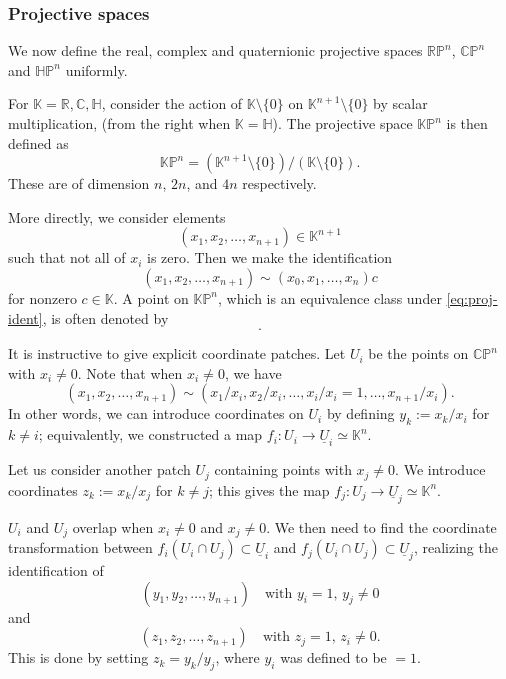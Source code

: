 \documentclass[12pt]{article}
\numberwithin{equation}{section}
\theoremstyle{remark}
\def\bC{\mathbb{C}}
\def\bH{\mathbb{H}}
\def\bK{\mathbb{K}}
\def\bR{\mathbb{R}}
\def\RP{\mathbb{RP}}
\def\CP{\mathbb{CP}}
\def\HP{\mathbb{HP}}
\def\KP{\mathbb{KP}}
\begin{document}
\subsubsection{Projective spaces}
We now define the real, complex and quaternionic projective spaces $\RP^n$, $\CP^n$ and $\HP^n$ uniformly.
\begin{example}
  \label{ex:proj}
  For $\bK=\bR,\bC,\bH$, 
  consider the action of $\bK\setminus \{0\}$ on
  $\bK^{n+1}\setminus\{0\}$ by scalar multiplication, (from the right when $\bK=\bH$).
  The projective space $\KP^n$ is then defined as
  \begin{equation}
    \KP^n = (\bK^{n+1}\setminus\{0\})/(\bK\setminus\{0\}).
  \end{equation}
  These are of dimension $n$, $2n$, and $4n$ respectively.
\end{example}
More directly, we consider elements 
\begin{equation}
(x_1,x_2,\ldots,x_{n+1})\in \bK^{n+1}
\end{equation} such that not all of $x_i$ is zero.
Then we make the identification \begin{equation}
  (x_1,x_2,\ldots,x_{n+1}) \sim  ( x_0, x_1, \ldots,  x_n)c \label{eq:proj-ident}
\end{equation} for nonzero $c\in \bK$.
A point on $\KP^n$,
which is an equivalence class under \eqref{eq:proj-ident},
is often denoted by \begin{equation}
  [x_1:x_2:\cdots:x_{n+1}].
\end{equation}


It is instructive to give explicit coordinate patches.
Let $U_i$ be the points on $\CP^n$ with $x_i\neq 0$.
Note that when $x_i\neq 0$, we have \begin{equation}
  (x_1,x_2,\ldots,x_{n+1}) \sim (x_1/x_i, x_2/x_i, \ldots, x_i/x_i=1, \ldots, x_{n+1}/x_i).
\end{equation} 
In other words, we can introduce coordinates on $U_i$ by defining  $y_k:=x_k/x_i$ for $k\neq i$;
equivalently, we constructed a map $f_i: U_i \to \underline{U}_i \simeq \bK^n$.

Let us consider another patch $U_j$ containing points with $x_j\neq 0$. 
We introduce coordinates $z_k:=x_k/x_j$ for $k\neq j$;
this gives the map $f_j: U_j \to \underline{U}_j\simeq \bK^n$.

$U_i$ and $U_j$ overlap when $x_i\neq 0$ and $x_j\neq 0$.
We then need to find the coordinate transformation 
between $f_i(U_i \cap U_j )\subset \underline{U}_i$
and $f_j(U_i \cap U_j) \subset \underline{U}_j$, realizing the identification of
\begin{equation}
  (y_1,y_2,\ldots,y_{n+1}) \quad \text{with $y_i=1$, $y_j\neq 0$}
\end{equation} and 
\begin{equation}
  (z_1,z_2,\ldots,z_{n+1}) \quad \text{with $z_j=1$, $z_i\neq 0$}.
\end{equation}
This is done by setting $z_k = y_k / y_j$, where $y_i$ was defined to be $=1$.
\end{document}
